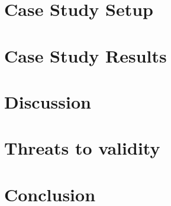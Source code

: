 \documentclass[10pt, conference]{IEEEtran}
\begin{document}
\section{Case Study Setup}
\label{sec:case_study_setup}


\section{Case Study Results}
\label{sec:results}


\section{Discussion}
\label{sec:discussion}


\section{Threats to validity}
\label{sec:threats_to_validity}


\section{Conclusion}
\label{sec:conclusion}




\end{document}
